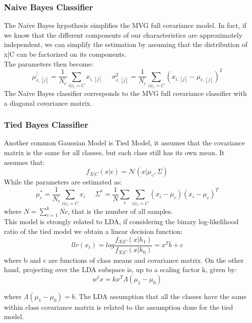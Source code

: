 \documentclass{article}
\begin{document}
\subsubsection{Naive Bayes Classifier}
The Naive Bayes hypothesis simplifies the MVG full covariance model. In fact, if we know that the different components of our characteristics are approximately independent, we can simplify the estimation by assuming that the distribution of x|C can be factorized on its components.\\
The parameters then become:
\begin{equation}
    \mu_{c,[j]}^] = \frac{1}{N_c} \sum_{i|c_i=C} x_{i,[j]} \;\;\;\;\; \sigma_{c,[j]}^2 = \frac{1}{N_c} \sum_{i|c_i=C} (x_{i,[j]} - \mu_{c,[j]})^2
\end{equation}
The Naïve Bayes classifier corresponds to the MVG full covariance classifier with a diagonal covariance matrix.
\subsubsection{Tied Bayes Classifier}
Another common Gaussian Model is Tied Model, it assumes that the covariance matrix is the same for all classes, but each class still has its own mean.
It assumes that:
\begin{equation}
    f_{X|C}(x|c) = \mathcal{N}(x|\mu_c,\Sigma)
\end{equation}
While the parameters are estimated as:
\begin{equation}
    \mu_c^* = \frac{1}{N_c} \sum_{i|c_i=C} x_{i} \;\;\;\;\; \Sigma^* = \frac{1}{N} \sum_{c} \sum_{i|c_i=C} (x_{i} - \mu_c)(x_{i} - \mu_c)^T
\end{equation}
where \(N= \sum_{c=1}^{k}Nc\), that is the number of all samples.\\
This model is strongly related to LDA, if considering the binary log-likelihood ratio of the tied model we obtain a linear decision function:
\begin{equation}
    llr(x_t) = log \frac{f_{X|C}(x|h_1)}{f_{X|C}(x|h_0)}= x^Tb+c
\end{equation}
where b and c are functions of class means and covariance matrix. On the other hand, projecting
over the LDA subspace is, up to a scaling factor k, given by:
\begin{equation}
   w^tx=k x^T \Lambda (\mu_1-\mu_0)
\end{equation}

where \( \Lambda(\mu_1-\mu_0)=b\). The LDA assumption that all the classes have the same within class covariance matrix is related to the assumption done for the tied model.
\end{document}
